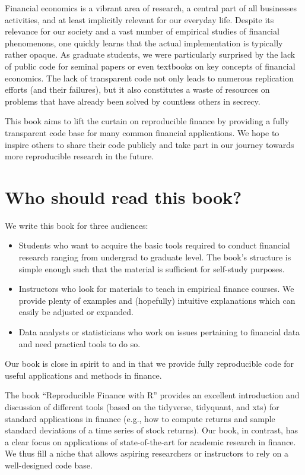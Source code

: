 \documentclass[
]{book}
\providecommand{\tightlist}{%
  \setlength{\itemsep}{0pt}\setlength{\parskip}{0pt}}
\begin{document}
Financial economics is a vibrant area of research, a central part of all businesses activities, and at least implicitly relevant for our everyday life. Despite its relevance for our society and a vast number of empirical studies of financial phenomenons, one quickly learns that the actual implementation is typically rather opaque.
As graduate students, we were particularly surprised by the lack of public code for seminal papers or even textbooks on key concepts of financial economics. The lack of transparent code not only leads to numerous replication efforts (and their failures), but it also constitutes a waste of resources on problems that have already been solved by countless others in secrecy.

This book aims to lift the curtain on reproducible finance by providing a fully transparent code base for many common financial applications. We hope to inspire others to share their code publicly and take part in our journey towards more reproducible research in the future.

\hypertarget{who-should-read-this-book}{%
\section*{Who should read this book?}\label{who-should-read-this-book}}


We write this book for three audiences:

\begin{itemize}
\tightlist
\item
  Students who want to acquire the basic tools required to conduct financial research ranging from undergrad to graduate level. The book's structure is simple enough such that the material is sufficient for self-study purposes.
\item
  Instructors who look for materials to teach in empirical finance courses. We provide plenty of examples and (hopefully) intuitive explanations which can easily be adjusted or expanded.\\
\item
  Data analysts or statisticians who work on issues pertaining to financial data and need practical tools to do so.
\end{itemize}

Our book is close in spirit to \citet{Regenstein2018} and \citet{Coqueret2020} in that we provide fully reproducible code for useful applications and methods in finance.

The book ``Reproducible Finance with R'' provides an excellent introduction and discussion of different tools (based on the tidyverse, tidyquant, and xts) for standard applications in finance (e.g., how to compute returns and sample standard deviations of a time series of stock returns). Our book, in contrast, has a clear focus on applications of state-of-the-art for academic research in finance. We thus fill a niche that allows aspiring researchers or instructors to rely on a well-designed code base.
\end{document}
